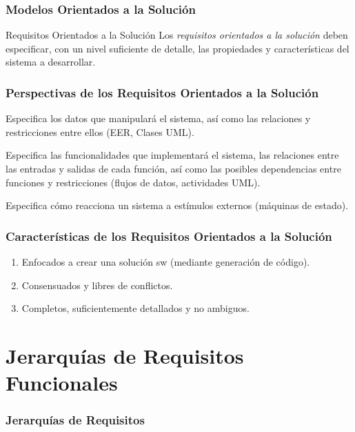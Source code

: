 \documentclass[handout,slidestop,xcolor=pst,dvips,blue]{beamer}
\begin{document}
\begin{frame}[c]
    \frametitle{Modelos Orientados a la Solución}
    \begin{block}{Requisitos Orientados a la Solución}
        Los \emph{requisitos orientados a la solución} deben especificar, con un nivel suficiente de detalle, las propiedades y características del sistema a desarrollar.
    \end{block}
\end{frame}

\begin{frame}[c]
    \frametitle{Perspectivas de los Requisitos Orientados a la Solución}
    \begin{description}[<+->]
        \item[Datos] Especifica los datos que manipulará el sistema, así como las relaciones y restricciones entre ellos (EER, Clases UML).
        \item[Funcional] Especifica las funcionalidades que implementará el sistema, las relaciones entre las entradas y salidas de cada función, así como las posibles dependencias entre funciones y restricciones (flujos de datos, actividades UML).
        \item[Comportamiento] Especifica cómo reacciona un sistema a estímulos externos (máquinas de estado).
    \end{description}
\end{frame}

\begin{frame}[c]
    \frametitle{Características de los Requisitos Orientados a la Solución}
    \begin{enumerate}[<+->]
        \item Enfocados a crear una solución sw (mediante generación de código).
        \item Consensuados y libres de conflictos.
        \item Completos, suficientemente detallados y no ambiguos.
    \end{enumerate}
\end{frame}

\section{Jerarquías de Requisitos Funcionales}

\begin{frame}
    \frametitle{Jerarquías de Requisitos}
\end{frame}
\end{document}
